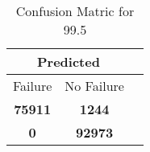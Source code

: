 \begin{table}[] 
\caption{Confusion Matric for 99.5} 
\label{Table: Prediction Accuracy-DMD99.5OnlySunEKF-ignoreReflectionEKF-top2-Reflection} 
\centering 
\begin{tabular} 
 {@{}ccc@{}} 
\toprule 
\multicolumn{2}{c}{\textbf{Predicted}}
 \\ \midrule 
\multicolumn{1}{|c|}{Failure} & 
\multicolumn{1}{c|}{No Failure}
 \\ \midrule 
\multicolumn{1}{|c|}{\color{green}\textbf{75911}} & 
\multicolumn{1}{c|}{\color{red}\textbf{1244}}
 \\ \midrule 
\multicolumn{1}{|c|}{\color{red}\textbf{0}} & 
\multicolumn{1}{c|}{\color{green}\textbf{92973}}
 \\ \bottomrule 
\end{tabular} 
\end{table} 
